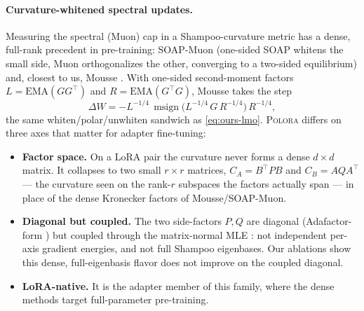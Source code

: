 \documentclass[11pt]{article}
\newcommand{\DW}{\Delta W}
\DeclareMathOperator{\polar}{msign}          %
\newcommand{\methodname}{\textsc{Polora}\xspace}
\theoremstyle{plain}
\theoremstyle{definition}
\theoremstyle{remark}
\begin{document}
\paragraph{Curvature-whitened spectral updates.} Measuring the spectral (Muon) cap in a Shampoo-curvature metric has a dense, full-rank precedent in pre-training: SOAP-Muon \cite{soapmuon} (one-sided SOAP whitens the small side, Muon orthogonalizes the other, converging to a two-sided equilibrium) and, closest to us, Mousse \cite{mousse}. With one-sided second-moment factors $L=\mathrm{EMA}(GG^\top)$ and $R=\mathrm{EMA}(G^\top G)$, Mousse takes the step
\begin{equation*}
  \DW=-L^{-1/4}\,\polar\!\big(L^{-1/4}\,G\,R^{-1/4}\big)\,R^{-1/4},
\end{equation*}
the same whiten/polar/unwhiten sandwich as \eqref{eq:ours-lmo}. \methodname{} differs on three axes that matter for adapter fine-tuning:
\begin{itemize}[leftmargin=1.5em,itemsep=1pt,topsep=2pt]
  \item \textbf{Factor space.} On a LoRA pair the curvature never forms a dense $d\times d$ matrix. It collapses to two small $r\times r$ matrices, $C_A=B^\top PB$ and $C_B=AQA^\top$ --- the curvature seen on the rank-$r$ subspaces the factors actually span --- in place of the dense Kronecker factors of Mousse/SOAP-Muon.
  \item \textbf{Diagonal but coupled.} The two side-factors $P,Q$ are diagonal (Adafactor-form \cite{adafactor}) but coupled through the matrix-normal MLE \cite{klshampoo}: not independent per-axis gradient energies, and not full Shampoo eigenbases. Our ablations show this dense, full-eigenbasis flavor does not improve on the coupled diagonal.
  \item \textbf{LoRA-native.} It is the adapter member of this family, where the dense methods target full-parameter pre-training.
\end{itemize}
\end{document}
